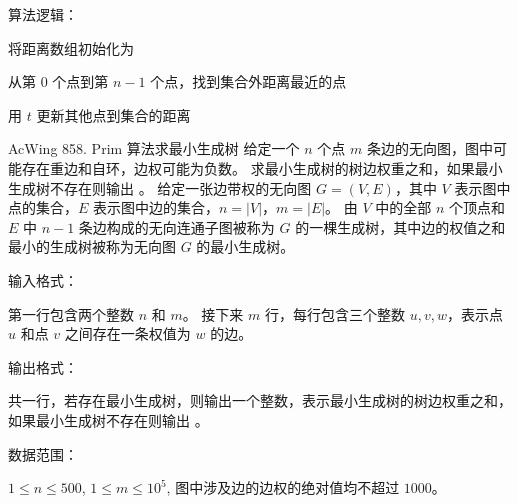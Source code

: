 算法逻辑：

\begin{myenum}
    \item 将距离数组初始化为 
    \item 从第 $0$ 个点到第 $n - 1$ 个点，找到集合外距离最近的点 
    \item 用 $t$ 更新其他点到集合的距离
\end{myenum}

\begin{titledbox}{AcWing 858. Prim 算法求最小生成树}
    给定一个 $n$ 个点 $m$ 条边的无向图，图中可能存在重边和自环，边权可能为负数。 求最小生成树的树边权重之和，如果最小生成树不存在则输出 。 给定一张边带权的无向图 $G=(V, E)$，其中 $V$ 表示图中点的集合，$E$ 表示图中边的集合，$n=|V|$，$m=|E|$。 由 $V$ 中的全部 $n$ 个顶点和 $E$ 中 $n-1$ 条边构成的无向连通子图被称为 $G$ 的一棵生成树，其中边的权值之和最小的生成树被称为无向图 $G$ 的最小生成树。

    输入格式：

    第一行包含两个整数 $n$ 和 $m$。 接下来 $m$ 行，每行包含三个整数 $u,v,w$，表示点 $u$ 和点 $v$ 之间存在一条权值为 $w$ 的边。

    输出格式：

    共一行，若存在最小生成树，则输出一个整数，表示最小生成树的树边权重之和，如果最小生成树不存在则输出 。

    数据范围：

    $1 \le n \le 500$, $1 \le m \le 10^5$, 图中涉及边的边权的绝对值均不超过 $1000$。

    \begin{inputblock}
         \\
         \\
         \\
         \\
         \\
    \end{inputblock}
    \begin{outputblock}
    \end{outputblock}
\end{titledbox}

